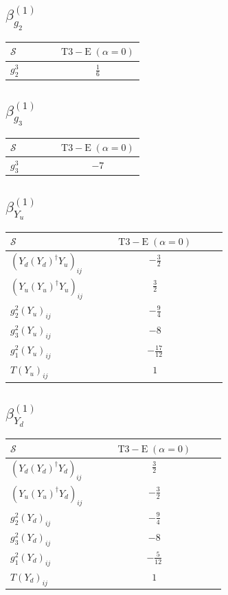 \documentclass[9pt]{article}
\begin{document}
\subsection*{$ \beta_{g_2}^{(1)} $}
\begin{longtable}{@{}p{0.38\linewidth}c@{}}
\toprule
$\mathcal{S}$ & $ \mathrm{T3-E}\;(\alpha=0) $ \\
\midrule
$ g_2^3 $ & $ \frac{1}{6} $ \\
\bottomrule
\end{longtable}
\subsection*{$ \beta_{g_3}^{(1)} $}
\begin{longtable}{@{}p{0.38\linewidth}c@{}}
\toprule
$\mathcal{S}$ & $ \mathrm{T3-E}\;(\alpha=0) $ \\
\midrule
$ g_3^3 $ & $ -7 $ \\
\bottomrule
\end{longtable}
\subsection*{$ \beta_{Y_u}^{(1)} $}
\begin{longtable}{@{}p{0.38\linewidth}c@{}}
\toprule
$\mathcal{S}$ & $ \mathrm{T3-E}\;(\alpha=0) $ \\
\midrule
$ (Y_d (Y_d)^{\dagger} Y_u)_{ij} $ & $ - \frac{3}{2} $ \\
$ (Y_u (Y_u)^{\dagger} Y_u)_{ij} $ & $ \frac{3}{2} $ \\
$ g_2^2 (Y_u)_{ij} $ & $ - \frac{9}{4} $ \\
$ g_3^2 (Y_u)_{ij} $ & $ -8 $ \\
$ g_1^2 (Y_u)_{ij} $ & $ - \frac{17}{12} $ \\
$ T (Y_u)_{ij} $ & $ 1 $ \\
\bottomrule
\end{longtable}
\subsection*{$ \beta_{Y_d}^{(1)} $}
\begin{longtable}{@{}p{0.38\linewidth}c@{}}
\toprule
$\mathcal{S}$ & $ \mathrm{T3-E}\;(\alpha=0) $ \\
\midrule
$ (Y_d (Y_d)^{\dagger} Y_d)_{ij} $ & $ \frac{3}{2} $ \\
$ (Y_u (Y_u)^{\dagger} Y_d)_{ij} $ & $ - \frac{3}{2} $ \\
$ g_2^2 (Y_d)_{ij} $ & $ - \frac{9}{4} $ \\
$ g_3^2 (Y_d)_{ij} $ & $ -8 $ \\
$ g_1^2 (Y_d)_{ij} $ & $ - \frac{5}{12} $ \\
$ T (Y_d)_{ij} $ & $ 1 $ \\
\bottomrule
\end{longtable}
\end{document}
